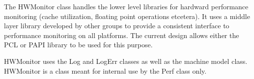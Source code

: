 %



The HWMonitor class handles the lower level libraries for
hardward performance monitoring (cache utilization, floating point operations
etcetera). It uses a middle layer library developed by other groups to provide 
a consistent interface to performance monitoring on all platforms. The current
design allows either the PCL or PAPI library to be used for this purpose. 

HWMonitor uses the Log and LogErr classes as well as the machine model class.
HWMonitor is a class meant for internal use by the Perf class only.

